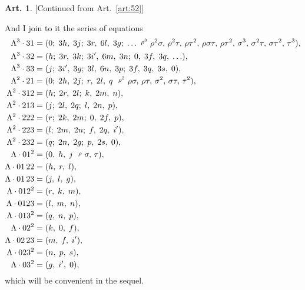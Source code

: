 \documentclass[12pt,a4paper]{article}
\theoremstyle{definition}
\newtheorem{art}{Art.}[section]
\begin{document}
\newpage
\begin{art}\label{art:52cont}
[Continued from Art.~\ref{art:52}]

And I join to it the series of equations
\begin{align*}
\Lambda^3 \cdot 31 &= (0;\; 3h,\; 3j;\; 3r,\; 6l,\; 3g;\; \ldots \,\, \raisebox{0.5ex}{\text{\scriptsize$\rho^3$}}\,\, \rho^2\sigma,\, \rho^2\tau,\, \rho\tau^2,\, \rho\sigma\tau,\, \rho\tau^2,\, \sigma^3,\, \sigma^2\tau,\, \sigma\tau^2,\, \tau^3),\\
\Lambda^3 \cdot 32 &= (h;\; 3r,\; 3k;\; 3i',\; 6m,\; 3n;\; 0,\; 3f,\; 3q,\; \ldots),\\
\Lambda^3 \cdot 33 &= (j;\; 3i',\; 3g;\; 3l,\; 6n,\; 3p;\; 3f,\; 3q,\; 3s,\; 0),\\
\Lambda^2 \cdot 21 &= (0;\; 2h,\; 2j;\; r,\; 2l,\; q \,\,\,\, \raisebox{0.5ex}{\text{\scriptsize$\rho^2$}}\,\, \rho\sigma,\, \rho\tau,\, \sigma^2,\, \sigma\tau,\, \tau^2),\\
\Lambda^2 \cdot 312 &= (h;\; 2r,\; 2l;\; k,\; 2m,\; n),\\
\Lambda^2 \cdot 213 &= (j;\; 2l,\; 2q;\; l,\; 2n,\; p),\\
\Lambda^2 \cdot 222 &= (r;\; 2k,\; 2m;\; 0,\; 2f,\; p),\\
\Lambda^2 \cdot 223 &= (l;\; 2m,\; 2n;\; f,\; 2q,\; i'),\\
\Lambda^2 \cdot 232 &= (q;\; 2n,\; 2g;\; p,\; 2s,\; 0),\\
\Lambda \cdot 01^2 &= (0,\; h,\; j \,\,\,\, \raisebox{0.5ex}{\text{\scriptsize$\rho$}}\,\, \sigma,\, \tau),\\
\Lambda \cdot 01\,22 &= (h,\; r,\; l),\\
\Lambda \cdot 01\,23 &= (j,\; l,\; g),\\
\Lambda \cdot 012^2 &= (r,\; k,\; m),\\
\Lambda \cdot 0123 &= (l,\; m,\; n),\\
\Lambda \cdot 013^2 &= (q,\; n,\; p),\\
\Lambda \cdot 02^2 &= (k,\; 0,\; f),\\
\Lambda \cdot 02\,23 &= (m,\; f,\; i'),\\
\Lambda \cdot 023^2 &= (n,\; p,\; s),\\
\Lambda \cdot 03^2 &= (g,\; i',\; 0),
\end{align*}
which will be convenient in the sequel.
\end{art}
\end{document}
